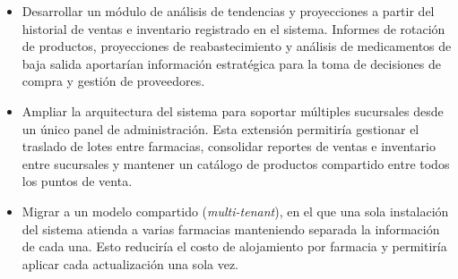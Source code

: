\begin{itemize}
    \item Desarrollar un módulo de análisis de tendencias y proyecciones a partir del historial de ventas e inventario registrado en el sistema. Informes de rotación de productos, proyecciones de reabastecimiento y análisis de medicamentos de baja salida aportarían información estratégica para la toma de decisiones de compra y gestión de proveedores.

    \item Ampliar la arquitectura del sistema para soportar múltiples sucursales desde un único panel de administración. Esta extensión permitiría gestionar el traslado de lotes entre farmacias, consolidar reportes de ventas e inventario entre sucursales y mantener un catálogo de productos compartido entre todos los puntos de venta.

    \item Migrar a un modelo compartido (\textit{multi-tenant}), en el que una sola instalación del sistema atienda a varias farmacias manteniendo separada la información de cada una. Esto reduciría el costo de alojamiento por farmacia y permitiría aplicar cada actualización una sola vez.

\end{itemize}
